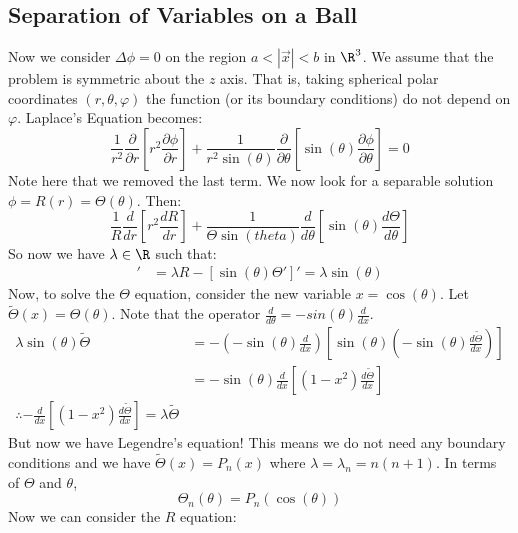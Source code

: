 \documentclass[../Main.tex]{subfiles}
\begin{document}
\subsection{Separation of Variables on a Ball}
Now we consider $\Delta \phi = 0$ on the region $a < |\vec{x}| < b$ in $\R^3$. We assume that the problem is symmetric about the $z$ axis. That is, taking spherical polar coordinates $(r, \theta, \varphi)$ the function (or its boundary conditions) do not depend on $\varphi$. Laplace's Equation becomes:
\begin{equation*}
    \frac{1}{r^2} \frac{\partial }{\partial r}\left[r^2 \frac{\partial \phi}{\partial r}\right] + \frac{1}{r^2 \sin(\theta)} \frac{\partial}{\partial \theta} \left[\sin(\theta) \frac{\partial \phi}{\partial \theta}\right] = 0
\end{equation*}
Note here that we removed the last term. We now look for a separable solution $\phi = R(r) = \Theta(\theta)$. Then:
\begin{equation*}
    \frac{1}{R} \frac{d}{dr} \left[r^2 \frac{dR}{dr}\right] + \frac{1}{\Theta \sin(theta)} \frac{d}{d\theta} \left[\sin(\theta) \frac{d\Theta}{d\theta}\right]
\end{equation*}
So now we have $\lambda \in \R$ such that:
\begin{align*}
    [r^2 R']' &= \lambda R
    -[\sin(\theta) \Theta']' = \lambda \sin(\theta)
\end{align*}
Now, to solve the $\Theta$ equation, consider the new variable $x = \cos(\theta)$. Let $\tilde{\Theta}(x) = \Theta(\theta)$. Note that the operator $\frac{d}{d\theta} = -sin(\theta) \frac{d}{dx}$.
\begin{align*}
    \lambda \sin(\theta) \tilde{\Theta} &= -\left(-\sin(\theta) \frac{d}{dx}\right) \left[\sin(\theta) \left(-\sin(\theta) \frac{d\tilde{\Theta}}{dx}\right)\right] \\
    &= -\sin(\theta) \frac{d}{dx} \left[(1 - x^2) \frac{d\tilde{\Theta}}{dx}\right] \\
    \therefore -\frac{d}{dx} \left[(1 - x^2) \frac{d\tilde{\Theta}}{dx}\right] = \lambda \tilde{\Theta}
\end{align*}
But now we have Legendre's equation! This means we do not need any boundary conditions and we have $\tilde{\Theta}(x) = P_n(x)$ where $\lambda = \lambda_n = n(n+1)$. In terms of $\Theta$ and $\theta$,
\begin{equation*}
    \Theta_n(\theta) = P_n(\cos(\theta))
\end{equation*}
Now we can consider the $R$ equation:
\end{document}
